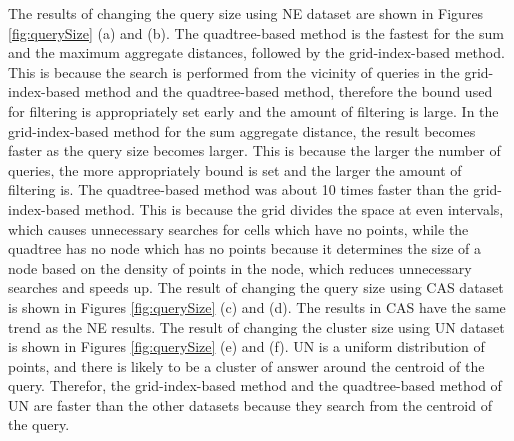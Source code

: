 \documentclass[a4paper,11pt]{report}
\theoremstyle{mytheoremstyle}
\begin{document}
The results of changing the query size using NE dataset are shown in Figures \ref{fig:querySize} (a) and (b). The quadtree-based method is the fastest for the sum and the maximum aggregate distances, followed by the grid-index-based method. This is because the search is performed from the vicinity of queries in the grid-index-based method and the quadtree-based method, therefore the bound used for filtering is appropriately set early and the amount of filtering is large. In the grid-index-based method for the sum aggregate distance, the result becomes faster as the query size becomes larger. This is because the larger the number of queries, the more appropriately bound is set and the larger the amount of filtering is.
The quadtree-based method was about 10 times faster than the grid-index-based method. This is because the grid divides the space at even intervals, which causes unnecessary searches for cells which have no points, while the quadtree has no node which has no points because it determines the size of a node based on the density of points in the node, which reduces unnecessary searches and speeds up.
The result of changing the query size using CAS dataset is shown in Figures \ref{fig:querySize} (c) and (d). The results in CAS have the same trend as the NE results.
The result of changing the cluster size using UN dataset is shown in Figures \ref{fig:querySize} (e) and (f). UN is a uniform distribution of points, and there is likely to be a cluster of answer around the centroid of the query. Therefor, the grid-index-based method and the quadtree-based method of UN are faster than the other datasets because they search from the centroid of the query.
\end{document}
